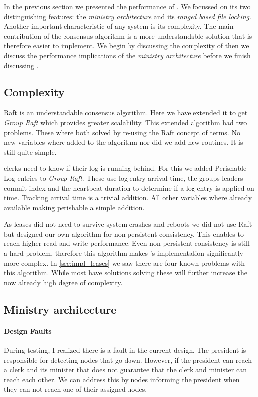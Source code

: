 In the previous section we presented the performance of \name{}. We focussed on its two distinguishing features: the \textit{ministry architecture} and its \textit{ranged based file locking}. Another important characteristic of any system is its complexity. The main contribution of the \raft{} consensus algorithm is a more understandable solution that is therefore easier to implement. We begin by discussing the complexity of \name{} then we discuss the performance implications of the \textit{ministry architecture} before we finish discussing .
%
\subsection{Complexity}
Raft is an understandable consensus algorithm. Here we have extended it to get \textit{Group Raft} which provides greater scalability. This extended algorithm had two problems. These where both solved by re-using the Raft concept of terms. No new variables where added to the algorithm nor did we add new routines. It is still quite simple. 

\Name{} clerks need to know if their log is running behind. For this we added Perishable Log entries to \textit{Group Raft}. These use log entry arrival time, the groups leaders commit index and the heartbeat duration to determine if a log entry is applied on time. Tracking arrival time is a trivial addition. All other variables where already available making perishable a simple addition.

As leases did not need to survive system crashes and reboots we did not use Raft but designed our own algorithm for non-persistent consistency. This enables \name{} to reach higher read and write performance. Even non-persistent consistency is still a hard problem, therefore this algorithm makes \name{}'s implementation significantly more complex. In \cref{sec:impl_leases} we saw there are four known problems with this algorithm. While most have solutions solving these will further increase the now already high degree of complexity.
%
\subsection{Ministry architecture}
\paragraph{Design Faults}
During testing, I realized there is a fault in the current design. The president is responsible for detecting nodes that go down. However, if the president can reach a clerk and its minister that does not guarantee that the clerk and minister can reach each other. We can address this by nodes informing the president when they can not reach one of their assigned nodes.

